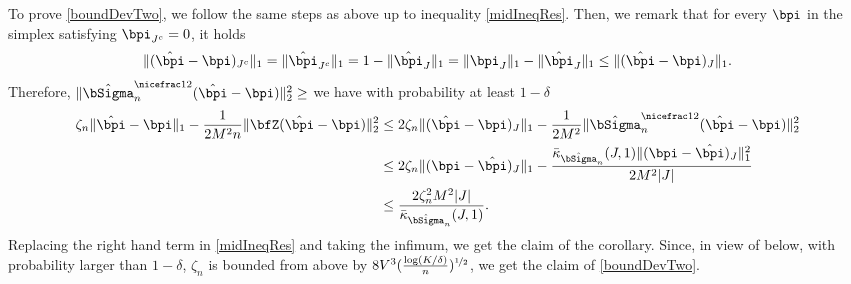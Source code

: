 To prove \eqref{boundDevTwo}, we follow the same steps as above up to inequality \eqref{midIneqRes}.
Then, we remark that for every $\bpi$ in the simplex satisfying $\bpi_{J^c}=0$, it holds
\begin{equation}\label{inqCone}
\|(\hat\bpi-\bpi)_{J^c}\|_1= \|\hat\bpi_{J^c}\|_1 = 1-\|\hat\bpi_{J}\|_1 =
\|\bpi_{J}\|_1-\|\hat\bpi_{J}\|_1\le \|(\hat\bpi-\bpi)_{J}\|_1.
\end{equation}
Therefore, $\|\hat\bSigma_n^{\nicefrac12}(\hat\bpi-\bpi)\|_2^2\ge $ we have with probability at least $1-\delta$
\begin{align}
  \zeta_n\| \hat\bpi - \bpi\|_1 -\frac{1}{2M^2n}\|\bfZ(\hat\bpi-\bpi)\|_2^2
        &\leq 2\zeta_n\| (\hat\bpi-\bpi)_J\|_1-\frac{1}{2M^2}\|\hat\bSigma_n^{\nicefrac12}(\hat\bpi-\bpi)\|_2^2\\
        &\leq 2\zeta_n\| (\bpi-\hat\bpi)_J\|_1 - \frac{\bar\kappa_{\hat\bSigma_n}(J,1)\| (\bpi-\hat\bpi)_J\|_1^2}{2M^2|J|}\\
        &\leq \frac{2\zeta_n^2M^2|J|}{\bar\kappa_{\hat\bSigma_n}(J,1)}.\label{ineqa}
\end{align}
Replacing the right hand term in \eqref{midIneqRes} and taking the infimum, we get
the claim of the corollary. Since, in view of  below, with probability
larger than $1-\delta$, $\zeta_n$ is bounded from above by
$8V^3(\frac{\log(K/\delta)}{n})^{\nicefrac12}$, we get the claim of \eqref{boundDevTwo}.


